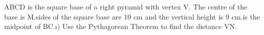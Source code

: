 \documentclass[preview]{standalone}
\begin{document}
\begin{center}
\begin{minipage}{12cm}\raggedright ABCD is the square base of a right pyramid with vertex V. The centre of the base is M.\The sides of the square base are 10 cm and the vertical height is 9 cm.\N is the midpoint of BC.\i) Use the Pythagorean Theorem to find the distance VN.\end{minipage}
\end{center}
\end{document}
